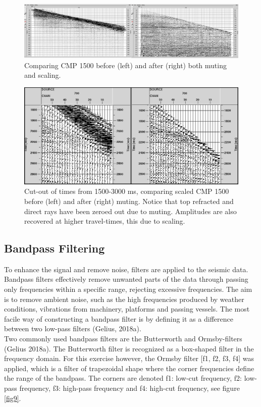 \documentclass[10pt,a4paper]{article}
\begin{document}
\begin{figure}[H]
\includegraphics[width=\textwidth]{fig7ekte.jpg}
\caption{Comparing CMP 1500 before (left) and after (right) both muting and scaling.}
\label{fig7}
\end{figure}

\begin{figure}[H]
\includegraphics[width=\textwidth]{fig8.jpg}
\caption{Cut-out of times from 1500-3000 ms, comparing scaled CMP 1500 before (left) and after (right) muting. Notice that top refracted and direct rays have been zeroed out due to muting. Amplitudes are also recovered at higher travel-times, this due to scaling.}
\label{fig8}
\end{figure}

\subsection{Bandpass Filtering}

To enhance the signal and remove noise, filters are applied to the seismic data. Bandpass filters effectively remove unwanted parts of the data through passing only frequencies within a specific range, rejecting excessive frequencies. The aim is to remove ambient noise, such as the high frequencies produced by weather conditions, vibrations from machinery, platforms and passing vessels. The most facile way of constructing a bandpass filter is by defining it as a difference between two low-pass filters (Gelius, 2018a). 
\\
Two commonly used bandpass filters are the Butterworth and Ormsby-filters (Gelius 2018a). The Butterworth filter is recognized as a box-shaped filter in the frequency domain. For this exercise however, the Ormsby filter [f1, f2, f3, f4] was applied, which is a filter of trapezoidal shape where the corner frequencies define the range of the bandpass. The corners are denoted f1: low-cut frequency, f2: low-pass frequency, f3: high-pass frequency and f4: high-cut frequency, see figure \ref{fig9}.
\end{document}
